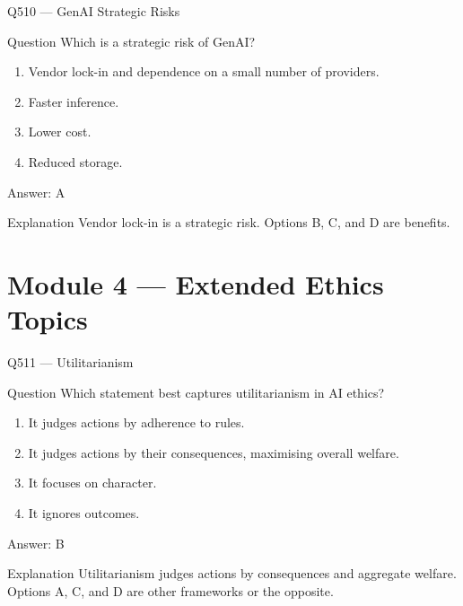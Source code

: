 \documentclass[aspectratio=169,8pt]{beamer}
\begin{document}
	\begin{frame}{Q510 --- GenAI Strategic Risks}
		\begin{block}{Question}
			Which is a strategic risk of GenAI?
			\begin{enumerate}
				\item Vendor lock-in and dependence on a small number of providers.
				\item Faster inference.
				\item Lower cost.
				\item Reduced storage.
			\end{enumerate}
		\end{block}
		\begin{exampleblock}{Answer: A}\end{exampleblock}
		\begin{block}{Explanation}
			Vendor lock-in is a strategic risk. Options B, C, and D are benefits.
		\end{block}
	\end{frame}
	
	\section{Module 4 --- Extended Ethics Topics}
	
	\begin{frame}{Q511 --- Utilitarianism}
		\begin{block}{Question}
			Which statement best captures utilitarianism in AI ethics?
			\begin{enumerate}
				\item It judges actions by adherence to rules.
				\item It judges actions by their consequences, maximising overall welfare.
				\item It focuses on character.
				\item It ignores outcomes.
			\end{enumerate}
		\end{block}
		\begin{exampleblock}{Answer: B}\end{exampleblock}
		\begin{block}{Explanation}
			Utilitarianism judges actions by consequences and aggregate welfare. Options A, C, and D are other frameworks or the opposite.
		\end{block}
	\end{frame}
	
\end{document}
